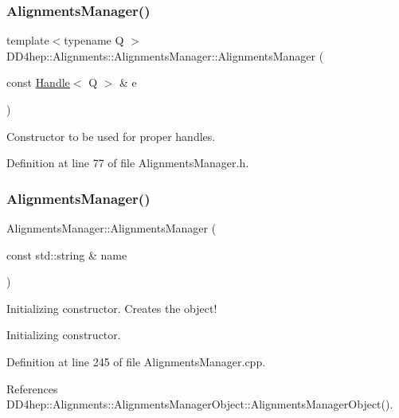 \subsubsection{\texorpdfstring{Alignments\+Manager()}{AlignmentsManager()}\hspace{0.1cm}{\footnotesize\ttfamily [4/6]}}
{\footnotesize\ttfamily template$<$typename Q $>$ \\
D\+D4hep\+::\+Alignments\+::\+Alignments\+Manager\+::\+Alignments\+Manager (\begin{DoxyParamCaption}\item[{const \hyperlink{class_d_d4hep_1_1_handle}{Handle}$<$ Q $>$ \&}]{e }\end{DoxyParamCaption})\hspace{0.3cm}{\ttfamily [inline]}}



Constructor to be used for proper handles. 



Definition at line 77 of file Alignments\+Manager.\+h.

\hypertarget{class_d_d4hep_1_1_alignments_1_1_alignments_manager_a3f12cc68d9ff6cc3aa240c1fde507fc6}{}\label{class_d_d4hep_1_1_alignments_1_1_alignments_manager_a3f12cc68d9ff6cc3aa240c1fde507fc6} 
\subsubsection{\texorpdfstring{Alignments\+Manager()}{AlignmentsManager()}\hspace{0.1cm}{\footnotesize\ttfamily [5/6]}}
{\footnotesize\ttfamily Alignments\+Manager\+::\+Alignments\+Manager (\begin{DoxyParamCaption}\item[{const std\+::string \&}]{name }\end{DoxyParamCaption})}



Initializing constructor. Creates the object! 

Initializing constructor. 

Definition at line 245 of file Alignments\+Manager.\+cpp.



References D\+D4hep\+::\+Alignments\+::\+Alignments\+Manager\+Object\+::\+Alignments\+Manager\+Object().

